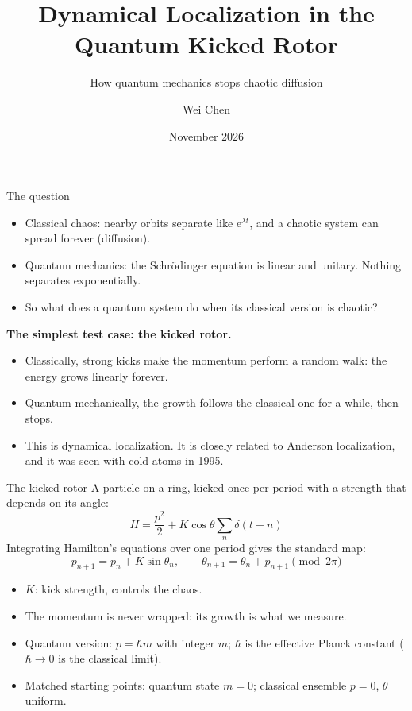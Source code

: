 \documentclass[aspectratio=169,10pt]{beamer}
\title{Dynamical Localization in the Quantum Kicked Rotor}
\subtitle{How quantum mechanics stops chaotic diffusion}
\author{Wei Chen}
\institute{PHY-315 Quantum Mechanics, final project}
\date{November 2026}
\newcommand{\ee}{\mathrm{e}}
\begin{document}
{\vfuzz=20pt\maketitle}

\begin{frame}{The question}
  \begin{itemize}
    \item Classical chaos: nearby orbits separate like $\ee^{\lambda t}$, and a chaotic system can spread forever
    (diffusion).
    \item Quantum mechanics: the Schr\"odinger equation is \alert{linear and unitary}. Nothing separates
    exponentially.
    \item So what does a quantum system do when its classical version is chaotic?
  \end{itemize}
  \vspace{0.6em}
  \textbf{The simplest test case: the kicked rotor.}
  \begin{itemize}
    \item Classically, strong kicks make the momentum perform a random walk: the energy grows linearly forever.
    \item Quantum mechanically, the growth follows the classical one for a while, then \alert{stops}.
    \item This is \alert{dynamical localization}. It is closely related to Anderson localization, and it was
    seen with cold atoms in 1995.
  \end{itemize}
\end{frame}

\begin{frame}{The kicked rotor}
  A particle on a ring, kicked once per period with a strength that depends on its angle:
  \[
    H = \frac{p^2}{2} + K\cos\theta\sum_{n}\delta(t - n)
  \]
  Integrating Hamilton's equations over one period gives the \alert{standard map}:
  \[
    p_{n+1} = p_n + K\sin\theta_n, \qquad \theta_{n+1} = \theta_n + p_{n+1} \pmod{2\pi}
  \]
  \begin{itemize}
    \item $K$: kick strength, controls the chaos.
    \item The momentum is never wrapped: its growth is what we measure.
    \item Quantum version: $p = \hbar m$ with integer $m$; $\hbar$ is the effective Planck constant
    ($\hbar\to0$ is the classical limit).
    \item Matched starting points: quantum state $m = 0$; classical ensemble $p = 0$, $\theta$ uniform.
  \end{itemize}
\end{frame}
\end{document}
